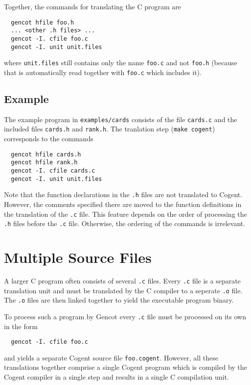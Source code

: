 \documentclass[a4paper]{report}
\newcommand{\code}[1]{\textnormal{\texttt{#1}}}
\begin{document}
Together, the commands for translating the C program are
\begin{verbatim}
  gencot hfile foo.h
  ... <other .h files> ...
  gencot -I. cfile foo.c
  gencot -I. unit unit.files
\end{verbatim}
where \code{unit.files} still contains only the name \code{foo.c} and not \code{foo.h} (because that is automatically
read together with \code{foo.c} which includes it).

\subsection{Example}

The example program in \code{examples/cards} consists of the file \code{cards.c} and the included files \code{cards.h}
and \code{rank.h}. The tranlation step (\code{make cogent}) corresponds to the commands
\begin{verbatim}
  gencot hfile cards.h
  gencot hfile rank.h
  gencot -I. cfile cards.c
  gencot -I. unit unit.files
\end{verbatim}

Note that the function declarations in the \code{.h} files are not translated to Cogent. However, the comments specified 
there are moved to the function definitions in the translation of the \code{.c} file. This feature depends on the order of
processing the \code{.h} files before the \code{.c} file. Otherwise, the ordering of the commands is irrelevant.

\section{Multiple Source Files}
\label{simple-multi}

A larger C program often consists of several \code{.c} files. Every \code{.c} file is a separate translation unit and
must be translated by the C compiler to a seperate \code{.o} file. The \code{.o} files are then linked together to
yield the executable program binary.

To process such a program by Gencot every \code{.c} file must be processed on its own in the form
\begin{verbatim}
  gencot -I. cfile foo.c
\end{verbatim}
and yields a separate Cogent source file \code{foo.cogent}. However, all these translations together comprise a single
Cogent program which is compiled by the Cogent compiler in a single step and results in a single C compilation unit.
\end{document}

